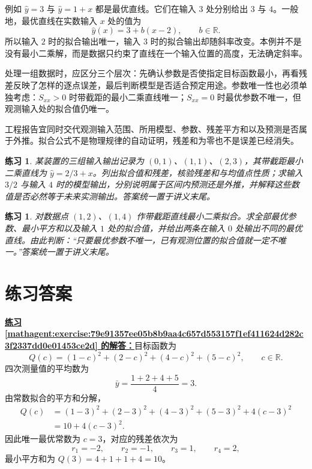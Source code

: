 \documentclass[UTF8,fontset=fandol,11pt]{ctexart}
\newtheorem{exercise}[definition]{练习}
\begin{document}
例如 $\hat{y}=3$ 与 $\hat{y}=1+x$ 都是最优直线。它们在输入 $3$ 处分别给出 $3$ 与 $4$。一般地，最优直线在实数输入 $x$ 处的值为
\[
\hat{y}(x)=3+b(x-2),\qquad b\in\mathbb{R}.
\]
所以输入 $2$ 时的拟合输出唯一，输入 $3$ 时的拟合输出却随斜率改变。本例并不是没有最小二乘解，而是数据只约束了直线在一个输入位置的高度，无法确定斜率。\par
处理一组数据时，应区分三个层次：先确认参数是否使指定目标函数最小，再看残差反映了怎样的逐点误差，最后判断模型是否适合预定用途。参数唯一性也必须单独考虑：$S_{xx}>0$ 时带截距的最小二乘直线唯一；$S_{xx}=0$ 时最优参数不唯一，但观测输入处的拟合值仍唯一。

工程报告宜同时交代观测输入范围、所用模型、参数、残差平方和以及预测是否属于外推。拟合公式不是物理规律的自动证明，残差和为零也不是误差已经消失。\par
\begin{exercise}
\label{mathagent:exercise:792316d6ae426af3441a87022eb342411ffcb273e3da7957f4be83fb59518d0a}
某装置的三组输入输出记录为 $(0,1)$、$(1,1)$、$(2,3)$，其带截距最小二乘直线为 $\hat{y}=2/3+x$。列出拟合值和残差，核验残差和与均值点性质；求输入 $3/2$ 与输入 $4$ 时的模型输出，分别说明属于区间内预测还是外推，并解释这些数值是否必然等于未来实测输出。答案统一置于讲义末尾。
\end{exercise}
\begin{exercise}
\label{mathagent:exercise:2a86525c0362bd6004ffb20b570bb82a80598d07bb305d4bd130c7cd7cc87533}
对数据点 $(1,2)$、$(1,4)$ 作带截距直线最小二乘拟合。求全部最优参数、最小平方和以及输入 $1$ 处的拟合值，并给出两条在输入 $0$ 处输出不同的最优直线。由此判断：“只要最优参数不唯一，已有观测位置的拟合值就一定不唯一。”答案统一置于讲义末尾。
\end{exercise}
\section*{练习答案}
\par\noindent\textbf{\hyperref[mathagent:exercise:79e91357ee05b8b9aa4c657d553157f1ef411624d282c3f2337dd0e01453ce2d]{练习 \ref*{mathagent:exercise:79e91357ee05b8b9aa4c657d553157f1ef411624d282c3f2337dd0e01453ce2d} 的解答：}}目标函数为
\[
Q(c)=(1-c)^2+(2-c)^2+(4-c)^2+(5-c)^2,\qquad c\in\mathbb{R}.
\]
四次测量值的平均数为
\[
\bar{y}=\frac{1+2+4+5}{4}=3.
\]
由常数拟合的平方和分解，
\[
\begin{aligned}
Q(c)&=(1-3)^2+(2-3)^2+(4-3)^2+(5-3)^2+4(c-3)^2\\
&=10+4(c-3)^2.
\end{aligned}
\]
因此唯一最优常数为 $c=3$，对应的残差依次为
\[
r_1=-2,\qquad r_2=-1,\qquad r_3=1,\qquad r_4=2,
\]
最小平方和为 $Q(3)=4+1+1+4=10$。
\end{document}
